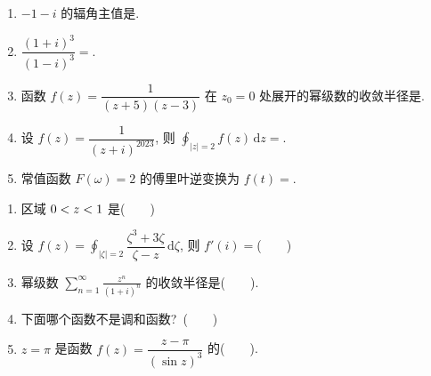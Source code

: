 \documentclass[simple]{hfutexam}
\newcommand{\diff}{\,\mathrm{d}}
\let\Re\relax\DeclareMathOperator{\Re}{Re}
\begin{document}
\begin{enumerate}
\item $-1-i$ 的辐角主值是\fillblankframe{}.
\item $\dfrac{(1+i)^3}{(1-i)^3}=$\fillblankframe{}.
\item 函数 $f(z)=\dfrac1{(z+5)(z-3)}$ 在 $z_0=0$ 处展开的幂级数的收敛半径是\fillblankframe{}.
\item 设 $f(z)=\dfrac1{(z+i)^{2023}}$, 则 $\displaystyle\oint_{|z|=2}f(z)\diff z=$\fillblankframe{}.
\item 常值函数 $F(\omega)=2$ 的傅里叶逆变换为 $f(t)=$\fillblankframe{}.
\end{enumerate}

\begin{enumerate}
\item 区域 $0<\Re z<1$ 是(~~~~)
\item 设 $f(z)=\displaystyle\oint_{|\zeta|=2}\dfrac{\zeta^3+3\zeta}{\zeta-z}\diff\zeta$, 则 $f'(i)=$(~~~~)
\item 幂级数 $\displaystyle\sum_{n=1}^\infty \frac{z^n}{(1+i)^n}$ 的收敛半径是(~~~~).
\item 下面哪个函数不是调和函数?~(~~~~)
\item $z=\pi$ 是函数 $f(z)=\dfrac{z-\pi}{(\sin z)^3}$ 的(~~~~).
\end{enumerate}
\end{document}
